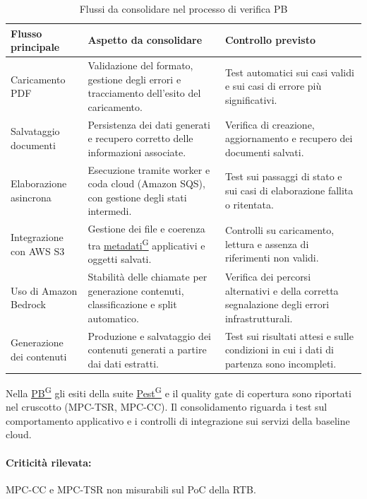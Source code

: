 \documentclass[a4paper,12pt]{article}
\providecommand{\glslink}[2]{\href{https://alittlebyte-19.github.io/Documentazione/glossario.html\#gls-#1}{\underline{#2}\textsuperscript{\scriptsize G}}}
\begin{document}
\begin{table}[H]
    \centering
    \renewcommand{\arraystretch}{1.25}
    \begin{tabularx}{\textwidth}{|p{3.3cm}|X|X|}
        \hline
        \rowcolor{gray!35}
        \textbf{Flusso principale} & \textbf{Aspetto da consolidare} & \textbf{Controllo previsto} \\
        \hline
        Caricamento PDF & Validazione del formato, gestione degli errori e tracciamento dell'esito del caricamento. & Test automatici sui casi validi e sui casi di errore più significativi. \\
        \hline
        Salvataggio documenti & Persistenza dei dati generati e recupero corretto delle informazioni associate. & Verifica di creazione, aggiornamento e recupero dei documenti salvati. \\
        \hline
        Elaborazione asincrona & Esecuzione tramite worker e coda cloud (Amazon SQS), con gestione degli stati intermedi. & Test sui passaggi di stato e sui casi di elaborazione fallita o ritentata. \\
        \hline
        Integrazione con AWS S3 & Gestione dei file e coerenza tra \glslink{metadati}{metadati} applicativi e oggetti salvati. & Controlli su caricamento, lettura e assenza di riferimenti non validi. \\
        \hline
        Uso di Amazon Bedrock & Stabilità delle chiamate per generazione contenuti, classificazione e split automatico. & Verifica dei percorsi alternativi e della corretta segnalazione degli errori infrastrutturali. \\
        \hline
        Generazione dei contenuti & Produzione e salvataggio dei contenuti generati a partire dai dati estratti. & Test sui risultati attesi e sulle condizioni in cui i dati di partenza sono incompleti. \\
        \hline
    \end{tabularx}
    \caption{Flussi da consolidare nel processo di verifica PB}
\end{table}

Nella \glslink{pb-product-baseline}{PB} gli esiti della suite \glslink{pest}{Pest} e il quality gate di copertura sono riportati nel cruscotto (MPC-TSR, MPC-CC). Il consolidamento riguarda i test sul comportamento applicativo e i controlli di integrazione sui servizi della baseline cloud.

\paragraph*{Criticità rilevata:} MPC-CC e MPC-TSR non misurabili sul PoC della RTB.
\end{document}
